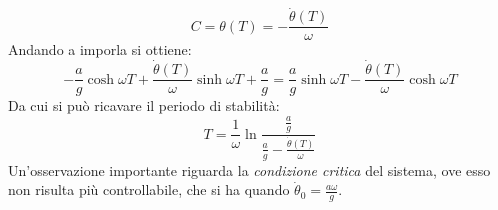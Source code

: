\documentclass[12pt, a4paper]{book}
\theoremstyle{theorem}
\begin{document}
				\begin{equation}
					C=\theta(T)=-\frac{\dot{\theta}(T)}{\omega}
				\end{equation}
				Andando a imporla si ottiene:
				\begin{equation}
					-\frac{a}{g}\cosh\omega T + \frac{\dot{\theta}(T)}{\omega}\sinh\omega T + \frac{a}{g} = \frac{a}{g}\sinh\omega T - \frac{\dot{\theta}(T)}{\omega}\cosh\omega T
				\end{equation}
				Da cui si può ricavare il periodo di stabilità:
				\begin{equation}
					T=\frac{1}{\omega}\ln\frac{\frac{a}{g}}{\frac{a}{g}-\frac{\dot{\theta}(T)}{\omega}}
				\end{equation}
				Un'osservazione importante riguarda la \emph{condizione critica} del sistema, ove esso non risulta più controllabile, che si ha quando $\dot{\theta}_0=\frac{a\omega}{g}$.
\end{document}

